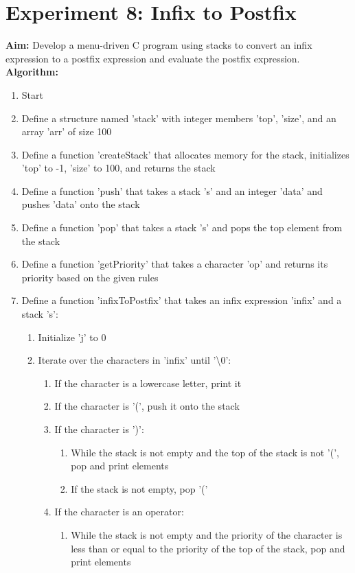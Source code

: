 \documentclass{article}
\begin{document}
\clearpage
\section{Experiment 8: Infix to Postfix}
\textbf{Aim:} Develop a menu-driven C program using stacks to convert an infix expression to a postfix expression and evaluate the postfix expression.
\\
\textbf{Algorithm:}
\begin{enumerate}
  \item Start
  \item Define a structure named 'stack' with integer members 'top', 'size', and an array 'arr' of size 100
  \item Define a function 'createStack' that allocates memory for the stack, initializes 'top' to -1, 'size' to 100, and returns the stack
  \item Define a function 'push' that takes a stack 's' and an integer 'data' and pushes 'data' onto the stack
  \item Define a function 'pop' that takes a stack 's' and pops the top element from the stack
  \item Define a function 'getPriority' that takes a character 'op' and returns its priority based on the given rules
  \item Define a function 'infixToPostfix' that takes an infix expression 'infix' and a stack 's':
    \begin{enumerate}
      \item Initialize 'j' to 0
      \item Iterate over the characters in 'infix' until '\textbackslash 0':
        \begin{enumerate}
          \item If the character is a lowercase letter, print it
          \item If the character is '(', push it onto the stack
          \item If the character is ')':
            \begin{enumerate}
              \item While the stack is not empty and the top of the stack is not '(', pop and print elements
              \item If the stack is not empty, pop '('
            \end{enumerate}
          \item If the character is an operator:
            \begin{enumerate}
              \item While the stack is not empty and the priority of the character is less than or equal to the priority of the top of the stack, pop and print elements

\end{enumerate}
\end{enumerate}
\end{enumerate}
\end{enumerate}
\end{document}
